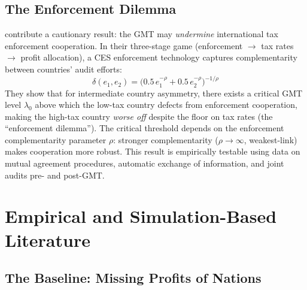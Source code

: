 \documentclass[11pt,a4paper]{article}
\begin{document}
\subsection{The Enforcement Dilemma}
\label{subsec:hindriks}

\citet{hindriks2025} contribute a cautionary result: the GMT may \emph{undermine} international tax enforcement cooperation. In their three-stage game (enforcement $\to$ tax rates $\to$ profit allocation), a CES enforcement technology captures complementarity between countries' audit efforts:
\begin{equation}
\delta(e_1, e_2) = \bigl(0.5\, e_1^{-\rho} + 0.5\, e_2^{-\rho}\bigr)^{-1/\rho}
\end{equation}
They show that for intermediate country asymmetry, there exists a critical GMT level $\lambda_0$ above which the low-tax country defects from enforcement cooperation, making the high-tax country \emph{worse off} despite the floor on tax rates (the ``enforcement dilemma''). The critical threshold depends on the enforcement complementarity parameter $\rho$: stronger complementarity ($\rho \to \infty$, weakest-link) makes cooperation more robust. This result is empirically testable using data on mutual agreement procedures, automatic exchange of information, and joint audits pre- and post-GMT.


\section{Empirical and Simulation-Based Literature}
\label{sec:empirical}


\subsection{The Baseline: Missing Profits of Nations}
\label{subsec:torslov}
\end{document}
